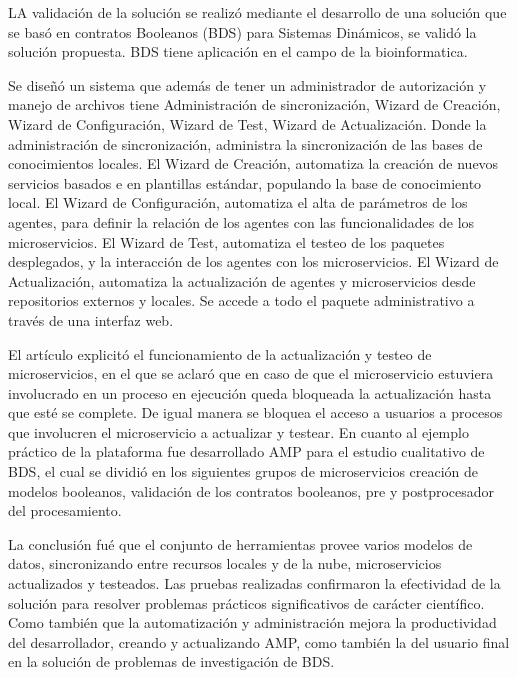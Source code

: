 LA validación de la solución se realizó mediante el desarrollo de una solución que se basó en contratos Booleanos (BDS) para Sistemas Dinámicos,
se validó la solución propuesta.
BDS tiene aplicación en el campo de la bioinformatica.\par

Se diseñó un sistema que además de tener un administrador de autorización y manejo de archivos tiene
Administración de sincronización, Wizard de Creación, Wizard de Configuración, Wizard de Test, Wizard de Actualización. Donde la administración de sincronización, administra la sincronización de las bases de conocimientos locales. El Wizard de Creación, automatiza la creación de nuevos servicios basados e en plantillas estándar,
populando la base de conocimiento local. El Wizard de Configuración, automatiza el alta de parámetros de los agentes,
para definir la relación de los agentes con las funcionalidades de los microservicios. El Wizard de Test, automatiza el testeo de los paquetes desplegados, y la interacción de los agentes con los microservicios. El Wizard de Actualización, automatiza la actualización de agentes y microservicios desde repositorios externos y locales.
Se accede a todo el paquete administrativo a través de una interfaz web.\par

El artículo explicitó el funcionamiento de la actualización y testeo de microservicios,
en el que se aclaró que en caso de que el microservicio estuviera involucrado
en un proceso en ejecución queda bloqueada la actualización hasta que esté se complete.
De igual manera se bloquea el acceso a usuarios a procesos que involucren el microservicio a actualizar y testear.
En cuanto al ejemplo práctico de la plataforma fue desarrollado AMP para el estudio cualitativo de BDS,
el cual se dividió en los siguientes grupos de microservicios creación de modelos booleanos, validación de los contratos booleanos, pre y postprocesador del procesamiento.\par

La conclusión fué que el conjunto de herramientas provee varios modelos de datos,
sincronizando entre recursos locales y de la nube, microservicios actualizados y testeados.
Las pruebas realizadas confirmaron la efectividad de la solución para resolver
problemas prácticos significativos de carácter científico. Como también que la automatización y administración
mejora la productividad del desarrollador, creando y actualizando AMP, como también la del usuario final en la
solución de problemas de investigación de BDS.\par
